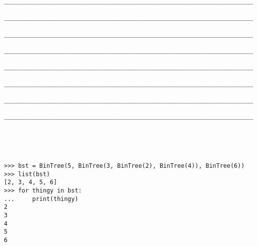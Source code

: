 \documentclass[twoside]{article}
\begin{document}
\begin{enumerate}
\begin{lstlisting}
____________________________________________________________________________
        
____________________________________________________________________________
        
____________________________________________________________________________
        
____________________________________________________________________________
        
____________________________________________________________________________
        
____________________________________________________________________________
        
____________________________________________________________________________
        
____________________________________________________________________________





>>> bst = BinTree(5, BinTree(3, BinTree(2), BinTree(4)), BinTree(6))
>>> list(bst)
[2, 3, 4, 5, 6]
>>> for thingy in bst:
...     print(thingy)
2
3
4
5
6
\end{lstlisting}

\end{enumerate}
\end{document}
